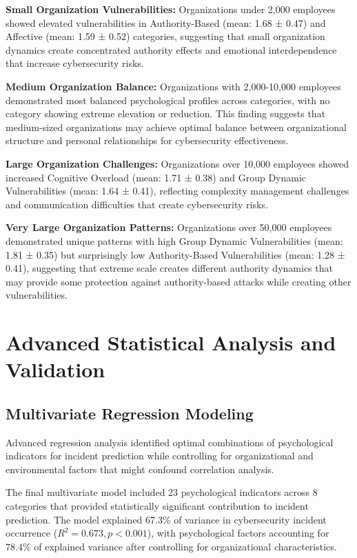 \documentclass[10pt, twocolumn]{article}
\begin{document}
\textbf{Small Organization Vulnerabilities:} Organizations under 2,000 employees showed elevated vulnerabilities in Authority-Based (mean: 1.68 ± 0.47) and Affective (mean: 1.59 ± 0.52) categories, suggesting that small organization dynamics create concentrated authority effects and emotional interdependence that increase cybersecurity risks.

\textbf{Medium Organization Balance:} Organizations with 2,000-10,000 employees demonstrated most balanced psychological profiles across categories, with no category showing extreme elevation or reduction. This finding suggests that medium-sized organizations may achieve optimal balance between organizational structure and personal relationships for cybersecurity effectiveness.

\textbf{Large Organization Challenges:} Organizations over 10,000 employees showed increased Cognitive Overload (mean: 1.71 ± 0.38) and Group Dynamic Vulnerabilities (mean: 1.64 ± 0.41), reflecting complexity management challenges and communication difficulties that create cybersecurity risks.

\textbf{Very Large Organization Patterns:} Organizations over 50,000 employees demonstrated unique patterns with high Group Dynamic Vulnerabilities (mean: 1.81 ± 0.35) but surprisingly low Authority-Based Vulnerabilities (mean: 1.28 ± 0.41), suggesting that extreme scale creates different authority dynamics that may provide some protection against authority-based attacks while creating other vulnerabilities.

\section{Advanced Statistical Analysis and Validation}

\subsection{Multivariate Regression Modeling}

Advanced regression analysis identified optimal combinations of psychological indicators for incident prediction while controlling for organizational and environmental factors that might confound correlation analysis.

The final multivariate model included 23 psychological indicators across 8 categories that provided statistically significant contribution to incident prediction. The model explained 67.3\% of variance in cybersecurity incident occurrence ($R^2 = 0.673, p < 0.001$), with psychological factors accounting for 78.4\% of explained variance after controlling for organizational characteristics.
\end{document}
